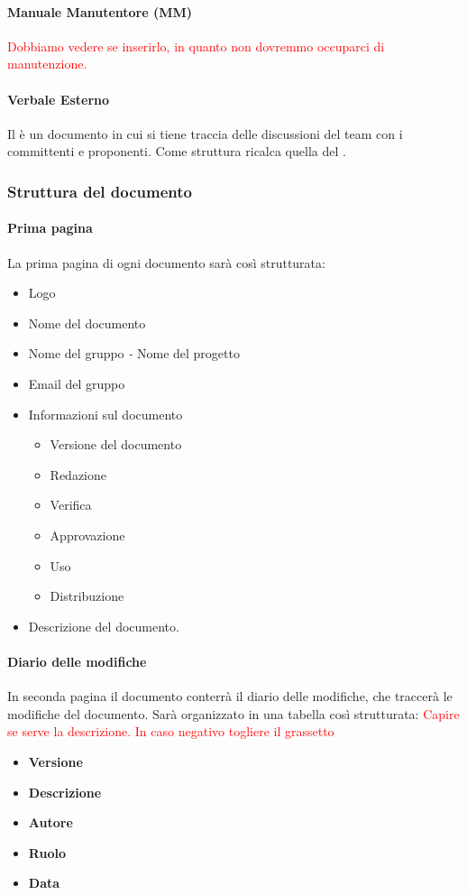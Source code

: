 \paragraph{Manuale Manutentore (MM)}
\textcolor{red}{Dobbiamo vedere se inserirlo, in quanto non dovremmo occuparci di manutenzione.}
\paragraph{Verbale Esterno}
Il \VE{} è un documento in cui si tiene traccia delle discussioni del team con i committenti e proponenti. Come struttura ricalca quella del \VI.

\subsubsection{Struttura del documento}
\paragraph{Prima pagina}
La prima pagina di ogni documento sarà così strutturata:
\begin{itemize}
	\item Logo
	\item Nome del documento
	\item Nome del gruppo \emph{-} Nome del progetto
	\item Email del gruppo
	\item Informazioni sul documento
	\begin{itemize}
		\item Versione del documento
		\item Redazione
		\item Verifica
		\item Approvazione
		\item Uso
		\item Distribuzione
	\end{itemize}
	\item Descrizione del documento.
\end{itemize}
\paragraph{Diario delle modifiche}
In seconda pagina il documento conterrà il diario delle modifiche, che traccerà le modifiche del documento. Sarà organizzato in una tabella così strutturata:
\textcolor{red}{Capire se serve la descrizione. In caso negativo togliere il grassetto}
\begin{itemize}
	\item \textbf{Versione}
	\item \textbf{Descrizione}
	\item \textbf{Autore}
	\item \textbf{Ruolo}
	\item \textbf{Data}
\end{itemize}
